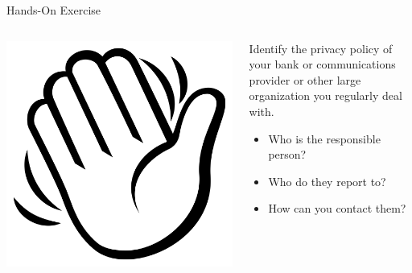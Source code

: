 \documentclass[ignorenonframetext,xcolor=x11names]{beamer}
\begin{document}
\begin{frame}{Hands-On Exercise}
\begin{columns}
\begin{column}{0.2\textwidth}
\href{https://commons.wikimedia.org/wiki/File:Emojione_BW_1F44B.svg}{\includegraphics[width=\textwidth]{hand.png}}
\end{column}
\begin{column}{0.8\textwidth}

Identify the privacy policy of your bank or communications provider or other large organization you regularly deal with. 
\begin{itemize}
  \item Who is the responsible person?
  \item Who do they report to?
  \item How can you contact them?
\end{itemize}
\end{column}
\end{columns}
\end{frame}
\end{document}
